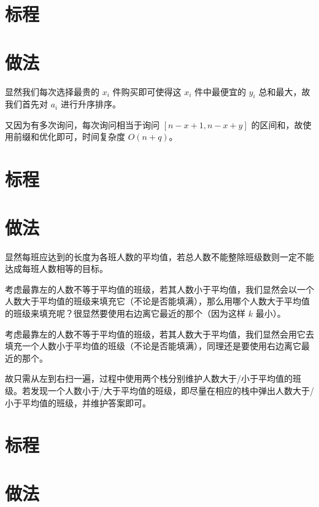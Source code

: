 \documentclass{../cpct/ctsol}
\begin{document}
\section*{标程}


\makesolution
\section*{做法}

显然我们每次选择最贵的 $x_i$ 件购买即可使得这 $x_i$ 件中最便宜的 $y_i$ 总和最大，故我们首先对 $a_i$ 进行升序排序。

又因为有多次询问，每次询问相当于询问 $[n-x+1, n-x+y]$ 的区间和，故使用前缀和优化即可，时间复杂度 $O(n+q)$。

\section*{标程}


\makesolution
\section*{做法}

显然每班应达到的长度为各班人数的平均值，若总人数不能整除班级数则一定不能达成每班人数相等的目标。

考虑最靠左的人数不等于平均值的班级，若其人数小于平均值，我们显然会以一个人数大于平均值的班级来填充它（不论是否能填满），那么用哪个人数大于平均值的班级来填充呢？很显然要使用右边离它最近的那个（因为这样 $k$ 最小）。

考虑最靠左的人数不等于平均值的班级，若其人数大于平均值，我们显然会用它去填充一个人数小于平均值的班级（不论是否能填满），同理还是要使用右边离它最近的那个。

故只需从左到右扫一遍，过程中使用两个栈分别维护人数大于/小于平均值的班级。若发现一个人数小于/大于平均值的班级，即尽量在相应的栈中弹出人数大于/小于平均值的班级，并维护答案即可。

\section*{标程}


\makesolution
\section*{做法}
\end{document}
